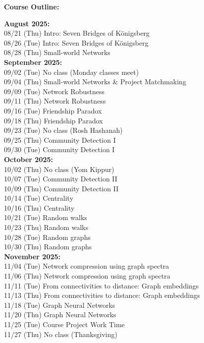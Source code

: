 \documentclass[11pt, a4paper]{article}
\begin{document}
\noindent \textbf{Course Outline:}
\begin{center}
\begin{minipage}{5in}
\begin{flushleft}
\textbf{August 2025:} \\
08/21 (Thu) \dotfill Intro: Seven Bridges of Königsberg \\
08/26 (Tue) \dotfill Intro: Seven Bridges of Königsberg \\
08/28 (Thu) \dotfill Small-world Networks \\

\textbf{September 2025:} \\
09/02 (Tue) \dotfill No class (Monday classes meet) \\
09/04 (Thu) \dotfill Small-world Networks \& Project Matchmaking\\
09/09 (Tue) \dotfill Network Robustness \\
09/11 (Thu) \dotfill Network Robustness \\
09/16 (Tue) \dotfill Friendship Paradox \\
09/18 (Thu) \dotfill Friendship Paradox \\
09/23 (Tue) \dotfill No class (Rosh Hashanah) \\
09/25 (Thu) \dotfill Community Detection I \\
09/30 (Tue) \dotfill Community Detection I \\

\textbf{October 2025:} \\
10/02 (Thu) \dotfill No class (Yom Kippur) \\
10/07 (Tue) \dotfill Community Detection II \\
10/09 (Thu) \dotfill Community Detection II \\
10/14 (Tue) \dotfill Centrality \\
10/16 (Thu) \dotfill Centrality \\
10/21 (Tue) \dotfill Random walks \\
10/23 (Thu) \dotfill Random walks \\
10/28 (Tue) \dotfill Random graphs \\
10/30 (Thu) \dotfill Random graphs \\

\textbf{November 2025:} \\
11/04 (Tue) \dotfill Network compression using graph spectra \\
11/06 (Thu) \dotfill Network compression using graph spectra \\
11/11 (Tue) \dotfill From connectivities to distance: Graph embeddings \\
11/13 (Thu) \dotfill From connectivities to distance: Graph embeddings \\
11/18 (Tue) \dotfill Graph Neural Networks \\
11/20 (Thu) \dotfill Graph Neural Networks \\
11/25 (Tue) \dotfill Course Project Work Time \\
11/27 (Thu) \dotfill No class (Thanksgiving) \\


\end{flushleft}
\end{minipage}
\end{center}
\end{document}
